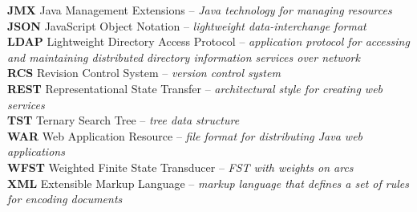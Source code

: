 \documentclass[12pt,a4paper]{report}
\let\openright=\clearpage
\begin{document}
\textbf{JMX} Java Management Extensions – \textit{Java technology for managing resources}
\\

\textbf{JSON} JavaScript Object Notation – \textit{lightweight data-interchange format}
\\

\textbf{LDAP} Lightweight Directory Access Protocol – \textit{application protocol for accessing and maintaining distributed directory information services over network}
\\

\textbf{RCS} Revision Control System – \textit{version control system}
\\

\textbf{REST} Representational State Transfer – \textit{architectural style for creating web services}
\\

\textbf{TST} Ternary Search Tree – \textit{tree data structure}
\\

\textbf{WAR} Web Application Resource – \textit{file format for distributing Java web applications}
\\

\textbf{WFST} Weighted Finite State Transducer – \textit{FST with weights on arcs}
\\

\textbf{XML} Extensible Markup Language – \textit{markup language that defines a set of rules for encoding documents}
\\

\appendix


\openright
\end{document}
